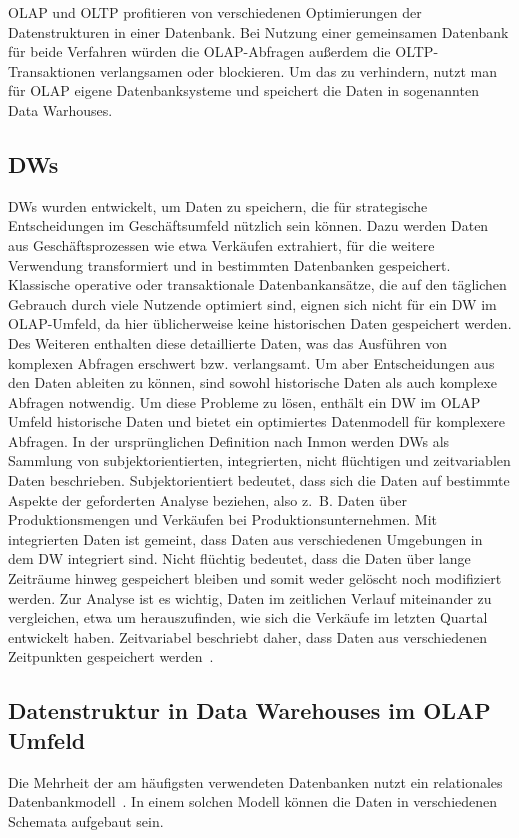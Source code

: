 \ac{OLAP} und \ac{OLTP} profitieren von verschiedenen Optimierungen der Datenstrukturen in einer Datenbank.
Bei Nutzung einer gemeinsamen Datenbank für beide Verfahren würden die \ac{OLAP}-Abfragen außerdem die \ac{OLTP}-Transaktionen verlangsamen oder blockieren.
Um das zu verhindern, nutzt man für \ac{OLAP} eigene Datenbanksysteme und speichert die Daten in sogenannten Data Warhouses.

\subsection{\acfp{DW}}
\acp{DW} wurden entwickelt, um Daten zu speichern, die für strategische Entscheidungen im Geschäftsumfeld nützlich sein können.
Dazu werden Daten aus Geschäftsprozessen wie etwa Verkäufen extrahiert, für die weitere Verwendung transformiert und in bestimmten Datenbanken gespeichert.
Klassische  operative oder transaktionale Datenbankansätze, die auf den täglichen Gebrauch durch viele Nutzende optimiert sind, eignen sich nicht für ein \ac{DW} im \ac{OLAP}-Umfeld, da hier üblicherweise keine historischen Daten gespeichert werden.
Des Weiteren enthalten diese detaillierte Daten, was das Ausführen von komplexen Abfragen erschwert bzw. verlangsamt.
Um aber Entscheidungen aus den Daten ableiten zu können, sind sowohl historische Daten als auch komplexe Abfragen notwendig.
Um diese Probleme zu lösen, enthält ein \ac{DW} im \ac{OLAP} Umfeld historische Daten und bietet ein optimiertes Datenmodell für komplexere Abfragen.
In der ursprünglichen Definition nach Inmon werden \acp{DW} als Sammlung von subjektorientierten, integrierten, nicht flüchtigen und zeitvariablen Daten beschrieben. %
Subjektorientiert bedeutet, dass sich die Daten auf bestimmte Aspekte der geforderten Analyse beziehen, also z.~B. Daten über Produktionsmengen und Verkäufen bei Produktionsunternehmen.
Mit integrierten Daten ist gemeint, dass Daten aus verschiedenen Umgebungen in dem \ac{DW} integriert sind.
Nicht flüchtig bedeutet, dass die Daten über lange Zeiträume hinweg gespeichert bleiben und somit weder gelöscht noch modifiziert werden.
Zur Analyse ist es wichtig, Daten im zeitlichen Verlauf miteinander zu vergleichen, etwa um herauszufinden, wie sich die Verkäufe im letzten Quartal entwickelt haben.
Zeitvariabel beschriebt daher, dass Daten aus verschiedenen Zeitpunkten gespeichert werden~\cite[S.~3f]{vaisman_data_2022}.

\subsection{Datenstruktur in Data Warehouses im OLAP Umfeld}
Die Mehrheit der am häufigsten verwendeten Datenbanken nutzt ein relationales Datenbankmodell~\cite{db-engines_most_2023}. 
In einem solchen Modell können die Daten in verschiedenen Schemata aufgebaut sein.

